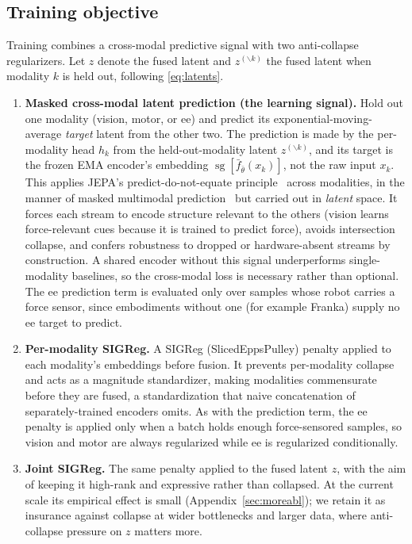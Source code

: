 \documentclass{article}
\begin{document}
\subsection{Training objective}
\label{sec:objective}
Training combines a cross-modal predictive signal with two anti-collapse regularizers. Let $z$ denote the fused latent and $z^{(\backslash k)}$ the fused latent when modality $k$ is held out, following \eqref{eq:latents}.

\begin{enumerate}
  \item \textbf{Masked cross-modal latent prediction (the learning signal).}
        Hold out one modality (vision, motor, or ee) and predict its exponential-moving-average \emph{target} latent from the other two. The prediction is made by the per-modality head $h_k$ from the held-out-modality latent $z^{(\backslash k)}$, and its target is the frozen EMA encoder's embedding $\operatorname{sg}[\bar f_{\bar\theta}(x_k)]$, not the raw input $x_k$. This applies JEPA's predict-do-not-equate principle~\citep{ijepa2023,data2vec2022} across modalities, in the manner of masked multimodal prediction~\citep{m3jepa2024,fourm2023,multimae2022} but carried out in \emph{latent} space. It forces each stream to encode structure relevant to the others (vision learns force-relevant cues because it is trained to predict force), avoids intersection collapse, and confers robustness to dropped or hardware-absent streams by construction. A shared encoder without this signal underperforms single-modality baselines, so the cross-modal loss is necessary rather than optional. The ee prediction term is evaluated only over samples whose robot carries a force sensor, since embodiments without one (for example Franka) supply no ee target to predict.
  \item \textbf{Per-modality SIGReg.} A SIGReg (SlicedEppsPulley) penalty applied
        to each modality's embeddings before fusion. It prevents per-modality collapse and acts as a magnitude standardizer, making modalities commensurate before they are fused, a standardization that naive concatenation of separately-trained encoders omits. As with the prediction term, the ee penalty is applied only when a batch holds enough force-sensored samples, so vision and motor are always regularized while ee is regularized conditionally.
  \item \textbf{Joint SIGReg.} The same penalty applied to the fused latent $z$,
        with the aim of keeping it high-rank and expressive rather than collapsed. At the current scale its empirical effect is small (Appendix~\ref{sec:moreabl}); we retain it as insurance against collapse at wider bottlenecks and larger data, where anti-collapse pressure on $z$ matters more.
\end{enumerate}
\end{document}
